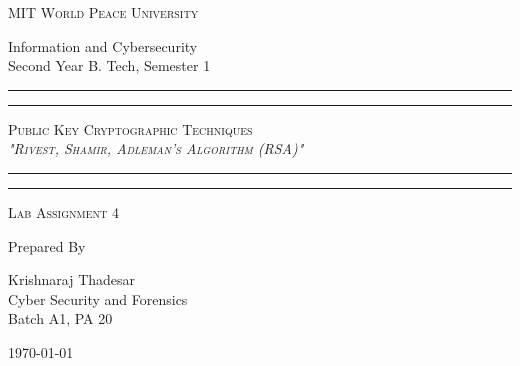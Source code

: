 \documentclass[11pt]{article}
\begin{document}
\begin{titlepage}
	\centering


	\huge\textsc{
		MIT World Peace University
	}\\

	\vspace{0.75\baselineskip} %

	\LARGE{
		Information and Cybersecurity\\
		Second Year B. Tech, Semester 1
	}

	\vfill %


	\rule{\textwidth}{1.6pt}\vspace*{-\baselineskip}\vspace*{2pt}
	\rule{\textwidth}{0.6pt}
	\vspace{0.75\baselineskip} %



	\huge{\textsc{
			Public Key Cryptographic Techniques\\
			\textit{"Rivest, Shamir, Adleman's Algorithm (RSA)"}
		}} \\



	\vspace{0.5\baselineskip} %
	\rule{\textwidth}{0.6pt}\vspace*{-\baselineskip}\vspace*{2.8pt}
	\rule{\textwidth}{1.6pt}

	\vspace{1\baselineskip} %


	\LARGE\textsc{
		Lab Assignment 4
	} %
	\vfill


	Prepared By
	\vspace{0.5\baselineskip} %

	\Large{
		Krishnaraj Thadesar \\
		Cyber Security and Forensics\\
		Batch A1, PA 20
	}


	\vspace{0.5\baselineskip} %
	\today

\end{titlepage}
\end{document}
